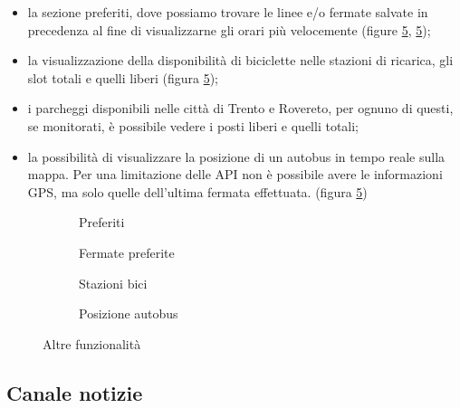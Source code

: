 \begin{itemize}
\item la sezione preferiti, dove possiamo trovare le linee e/o fermate salvate in precedenza al fine di visualizzarne gli orari più velocemente (figure \ref{fig:varie_funzionalita}, \ref{fig:varie_funzionalita});

\item la visualizzazione della disponibilità di biciclette nelle stazioni di ricarica, gli slot totali e quelli liberi (figura \ref{fig:varie_funzionalita});

\item i parcheggi disponibili nelle città di Trento e Rovereto, per ognuno di questi, se monitorati, è possibile vedere i posti liberi e quelli totali; 

\item la possibilità di visualizzare la posizione di un autobus in tempo reale sulla mappa. Per una limitazione delle API non è possibile avere le informazioni GPS, ma solo quelle dell'ultima fermata effettuata. (figura \ref{fig:varie_funzionalita}) 
\end{itemize}

\begin{figure}[htb]
    \centering 
\begin{subfigure}{0.20\textwidth}
\caption{Preferiti}
\label{fig:bot-preferiti}
\end{subfigure}\hfil
\begin{subfigure}{0.20\textwidth}
\caption{Fermate preferite}
\label{fig:bot-fermate-preferite}
\end{subfigure}\hfil 
\begin{subfigure}{0.20\textwidth}
\caption{Stazioni bici}
\label{fig:bot-stazioni-bici}
\end{subfigure}\hfil 
\begin{subfigure}{0.20\textwidth}
\caption{Posizione autobus}
\label{fig:bot-posizione-autobus}
\end{subfigure}
\caption{
\label{fig:varie_funzionalita}Altre funzionalità}
\end{figure}


\subsection{Canale notizie}


